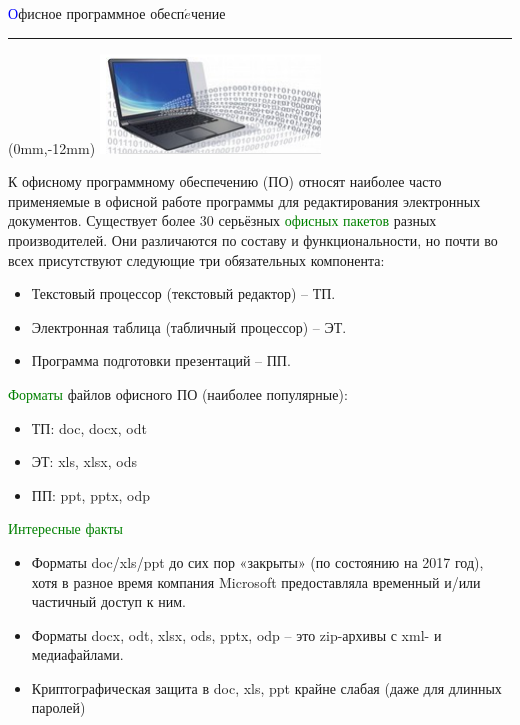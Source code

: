 \documentclass[9pt]{beamer}
\begin{document}
	\begin{frame}
	\begin{flushright}
	\vspace{1em}
		\large{\textcolor{blue}{О}фисное программное обесп$\acute{e}$чение}
		\\ \rule{10cm}{0.4pt}
	\end{flushright}
	\begin{textblock*}{0mm}(0mm,-12mm)
		\includegraphics[scale=0.7]{balakshin.png}
	\end{textblock*}
\vspace{1.5em}
	К офисному программному обеспечению (ПО) относят наиболее часто
применяемые в офисной работе программы для редактирования электронных документов.
Существует более 30 серьёзных \textcolor{green} {офисных пакетов} разных производителей. Они различаются по
составу и функциональности, но почти во всех присутствуют следующие три обязательных
компонента:
	\begin{itemize}
		\item Текстовый процессор (текстовый редактор) – ТП.
		\item Электронная таблица (табличный процессор) – ЭТ.
		\item Программа подготовки презентаций – ПП.
	\end{itemize}
	\textcolor{green}{Форматы} файлов офисного ПО (наиболее популярные):
	\begin{itemize}
		\item ТП: doc, docx, odt
		\item ЭТ: xls, xlsx, ods
		\item ПП: ppt, pptx, odp
	\end{itemize}
	\textcolor{green}{Интересные факты}
	\begin{itemize}
		\item Форматы doc/xls/ppt до сих пор «закрыты» (по состоянию на 2017 год), хотя в разное время
компания Microsoft предоставляла временный и/или частичный доступ к ним.
		\item Форматы docx, odt, xlsx, ods, pptx, odp – это zip-архивы с xml- и медиафайлами.
		\item Криптографическая защита в doc, xls, ppt крайне слабая (даже для длинных паролей)
	\end{itemize}
	\end{frame}
\end{document}
